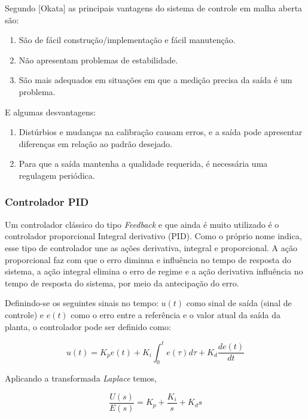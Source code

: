 Segundo [Okata] as principais vantagens do sistema de controle em malha aberta são:
\begin{enumerate}
    \item São de fácil construção/implementação e fácil manutenção.
    \item Não apresentam problemas de estabilidade.
    \item São mais adequados em situações em que a medição precisa da saída é um problema.
\end{enumerate}

E algumas desvantagens:

\begin{enumerate}
    \item Distúrbios e mudanças na calibração causam erros, e a saída pode apresentar diferenças
    em relação ao padrão desejado.
    \item Para que a saída mantenha a qualidade requerida, é necessária uma regulagem periódica.
\end{enumerate}


\subsubsection{Controlador PID}
Um controlador clássico do tipo \emph{Feedback} e que ainda é muito utilizado é o controlador proporcional Integral derivativo (PID). Como o próprio nome indica, esse tipo de controlador une as ações derivativa, integral e proporcional. A ação proporcional faz com que o erro diminua e influência no tempo de resposta do sistema, a ação integral elimina o erro de regime e a ação derivativa influência no tempo de resposta do sistema, por meio da antecipação do erro.

Definindo-se os seguintes sinais no tempo: $u(t)$ como sinal de saída (sinal de controle) e $e(t)$ como o erro entre a referência e o valor atual da saída da planta, o controlador pode ser definido como:

\begin{equation}
    u(t) = K_{p}e(t) + K_{i} \int^{t}_{0}e(\tau)d\tau + K_{d}\frac{d e(t)}{dt}
\end{equation}

Aplicando a transformada \emph{Laplace} temos,

\begin{equation}
    \frac{U(s)}{E(s)} = K_{p} + \frac{K_{i}}{s} + K_{d}s
\end{equation}

